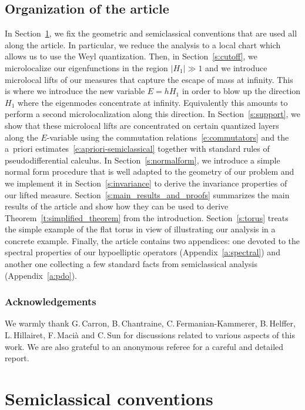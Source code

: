 \documentclass[JEP,XML,SOM,Unicode, NoEqCountersInSection,published]{cedram}
\theoremstyle{plain}
\theoremstyle{definition}
\theoremstyle{remark}
\begin{document}
\subsection{Organization of the article}
In Section~\ref{s:expression}, we fix the geometric and semiclassical conventions that are used all along the article. In particular, we reduce the analysis to a local chart which allows us to use the Weyl quantization. Then, in Section~\ref{s:cutoff}, we microlocalize our eigenfunctions in the region $|H_1|\gg 1$ and we introduce microlocal lifts of our measures that capture the escape of mass at infinity. This is where we introduce the new variable $E=hH_1$ in order to blow up the direction $H_1$ where the eigenmodes concentrate at infinity. Equivalently this amounts to perform a second microlocalization along this direction. In Section~\ref{s:support}, we show that these microlocal lifts are concentrated on certain quantized layers along the $E$-variable using the commutation relations~\eqref{e:commutators} and the a~priori estimates~\eqref{e:apriori-semiclassical} together with standard rules of pseudodifferential calculus. In Section~\ref{s:normalform}, we introduce a simple normal form procedure that is well adapted to the geometry of our problem and we implement it in Section~\ref{s:invariance} to derive the invariance properties of our lifted measure. Section~\ref{s:main_results_and_proofs} summarizes the main results of the article and show how they can be used to derive Theorem~\ref{t:simplified_theorem} from the introduction. Section~\ref{s:torus} treats the simple example of the flat torus in view of illustrating our analysis in a concrete example. Finally, the article contains two appendices: one devoted to the spectral properties of our hypoelliptic operators (Appendix~\ref{a:spectral}) and another one collecting a few standard facts from semiclassical analysis (Appendix~\ref{a:pdo}).

\subsubsection*{Acknowledgements}
We warmly thank G.\,Carron, B.\,Chantraine, C.\,Fermanian-Kammerer, B.\,Helffer, L.\,Hillairet, F.\,Macià and C.\,Sun for discussions related to various aspects of this work. We are also grateful to an anonymous referee for a careful and detailed report.

\section{Semiclassical conventions}\label{s:expression}
\end{document}
